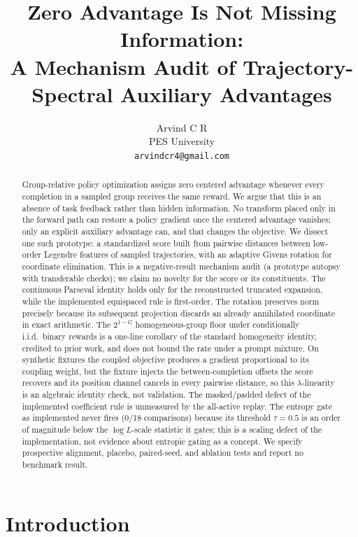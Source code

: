 \documentclass{article}
\title{Zero Advantage Is Not Missing Information:\\
A Mechanism Audit of Trajectory-Spectral Auxiliary Advantages}
\author{%
  Arvind C R \\
  PES University \\
  \texttt{arvindcr4@gmail.com}
}
\begin{document}
\maketitle

\begin{abstract}
Group-relative policy optimization assigns zero centered advantage whenever
every completion in a sampled group receives the same reward.  We argue that
this is an absence of task feedback rather than hidden information.  No
transform placed only in the forward path can restore a policy gradient once
the centered advantage vanishes; only an explicit auxiliary advantage can,
and that changes the objective.  We dissect one such prototype: a standardized
score built from pairwise distances between low-order Legendre features of
sampled trajectories, with an adaptive Givens rotation for coordinate
elimination.  This is a negative-result mechanism audit (a prototype
autopsy with transferable checks); we claim no novelty for the score or its
constituents. The
continuous Parseval identity holds only for the reconstructed truncated
expansion, while the implemented equispaced rule is first-order.  The
rotation preserves norm precisely because its subsequent projection discards
an already annihilated coordinate in exact arithmetic. The
$2^{1-G}$ homogeneous-group floor under conditionally i.i.d.\ binary rewards
is a one-line corollary of the standard homogeneity identity, credited to
prior work, and does not bound the rate under a prompt mixture. On synthetic fixtures the coupled objective produces a gradient
proportional to its coupling weight, but the fixture injects the
between-completion offsets the score recovers and its position channel
cancels in every pairwise distance, so this $\lambda$-linearity is an
algebraic identity check, not validation. The masked/padded defect of
the implemented coefficient rule is unmeasured by the all-active replay. The entropy gate as implemented never fires (0/18 comparisons)
because its threshold $\tau=0.5$ is an order of magnitude below the
$\log L$-scale statistic it gates; this is a scaling defect of the
implementation, not evidence about entropic gating as a concept. We
specify prospective alignment, placebo, paired-seed, and ablation tests
and report no benchmark result.
\end{abstract}

\section{Introduction}
\end{document}

